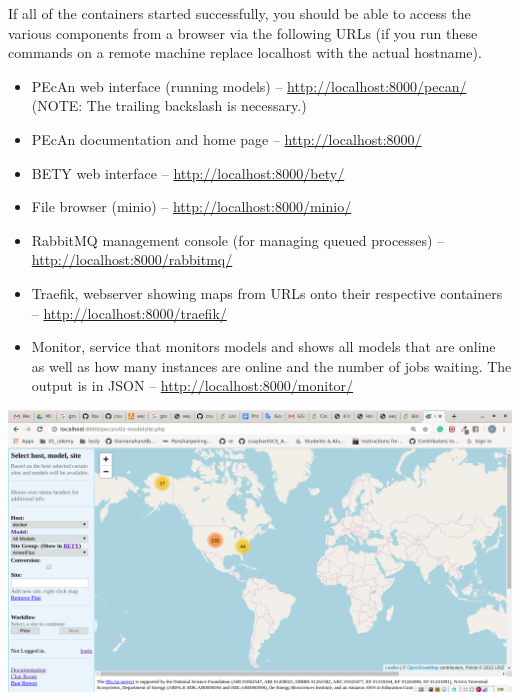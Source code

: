 \documentclass{eepecan}
\begin{document}
	If all of the containers started successfully, you should be able to access the various components from a browser via the following URLs (if you run these commands on a remote machine replace localhost with the actual hostname).
	\begin{itemize}
	\item PEcAn web interface (running models) – \href{http://localhost:8000/pecan/}{http://localhost:8000/pecan/} (NOTE: The trailing backslash is necessary.)
	\item PEcAn documentation and home page – \href{http://localhost:8000/}{http://localhost:8000/}
 	\item BETY web interface – \href{http://localhost:8000/bety/}{http://localhost:8000/bety/}
	\item File browser (minio) – \href{http://localhost:8000/minio/}{http://localhost:8000/minio/}
	\item RabbitMQ management console (for managing queued processes) – \href{http://localhost:8000/rabbitmq/}{http://localhost:8000/rabbitmq/}
	\item Traefik, webserver showing maps from URLs onto their respective containers – \href{http://localhost:8000/traefik/}{http://localhost:8000/traefik/}
	\item Monitor, service that monitors models and shows all models that are online as well as how many instances are online and the number of jobs 	waiting. The output is in JSON – \href{http://localhost:8000/monitor/}{http://localhost:8000/monitor/}
	\end{itemize}

	\begin{novspacecenter}
	\includegraphics[width=150mm]{figures/fig03_lives}
	\label{fig:fig01main}
	\end{novspacecenter}
\end{document}
